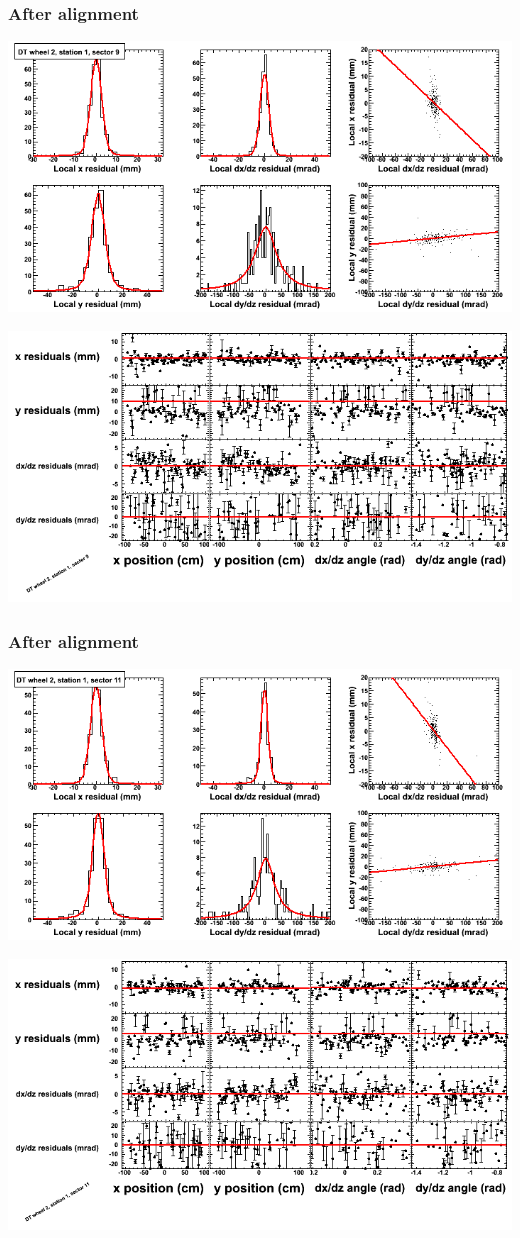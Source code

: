 \documentclass[compress]{beamer}
\begin{document}
\begin{frame}
\frametitle{After alignment}
\includegraphics[width=0.7\linewidth]{NOV4_fitfunctions/MBwhEst1sec09_bellcurves.png}

\includegraphics[width=0.7\linewidth]{NOV4_fitfunctions/MBwhEst1sec09_polynomials.png}
\end{frame}

\begin{frame}
\frametitle{After alignment}
\includegraphics[width=0.7\linewidth]{NOV4_fitfunctions/MBwhEst1sec11_bellcurves.png}

\includegraphics[width=0.7\linewidth]{NOV4_fitfunctions/MBwhEst1sec11_polynomials.png}
\end{frame}
\end{document}
